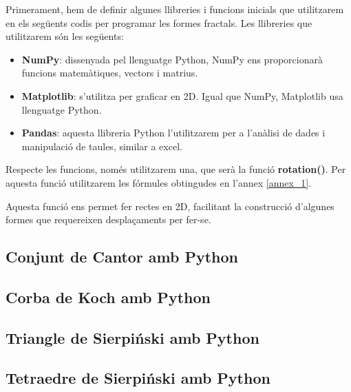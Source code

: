 \documentclass[12pt,a4paper]{report}
\begin{document}
Primerament, hem de definir algunes llibreries i funcions inicials que utilitzarem en els següents codis per programar les formes fractals.  Les llibreries que utilitzarem són les següents:

{
}

\begin{itemize}
\item \textbf{NumPy}: dissenyada pel llenguatge Python, NumPy ens proporcionarà funcions matemàtiques, vectors i matrius. 
\item \textbf{Matplotlib}: s'utilitza per graficar en 2D. Igual que NumPy, Matplotlib usa llenguatge Python.
\item \textbf{Pandas}: aquesta llibreria Python l'utilitzarem per a l'anàlisi de dades i manipulació de taules, similar a excel.
\end{itemize} 

Respecte les funcions, només utilitzarem una, que serà la funció \textbf{rotation()}. Per aquesta funció utilitzarem les fórmules obtingudes en l'annex \ref{annex_1}.
\newpage
{
}

Aquesta funció ens permet fer rectes en 2D, facilitant la construcció d'algunes formes que requereixen  desplaçaments per fer-se.

\subsection{Conjunt de Cantor amb Python}

{
}

\subsection{Corba de Koch amb Python}

{
}

\subsection{Triangle de Sierpiński amb Python}

{
}
\newpage
\subsection{Tetraedre de Sierpiński amb Python}
\end{document}
